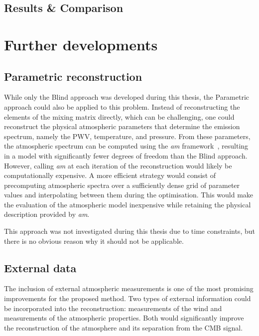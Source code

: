 \documentclass[../../thesis.tex]{subfiles}
\begin{document}
\subsection{Results \& Comparison} 


\section{Further developments}


\subsection{Parametric reconstruction}

While only the Blind approach was developed during this thesis, the Parametric approach could also be applied to this problem. Instead of reconstructing the elements of the mixing matrix directly, which can be challenging, one could reconstruct the physical atmospheric parameters that determine the emission spectrum, namely the PWV, temperature, and pressure.
From these parameters, the atmospheric spectrum can be computed using the \emph{am} framework~\cite{paine2024}, resulting in a model with significantly fewer degrees of freedom than the Blind approach. However, calling \emph{am} at each iteration of the reconstruction would likely be computationally expensive. A more efficient strategy would consist of precomputing atmospheric spectra over a sufficiently dense grid of parameter values and interpolating between them during the optimisation. This would make the evaluation of the atmospheric model inexpensive while retaining the physical description provided by \emph{am}.

This approach was not investigated during this thesis due to time constraints, but there is no obvious reason why it should not be applicable.

\subsection{External data}

The inclusion of external atmospheric measurements is one of the most promising improvements for the proposed method. Two types of external information could be incorporated into the reconstruction: measurements of the wind and measurements of the atmospheric properties. Both would significantly improve the reconstruction of the atmosphere and its separation from the CMB signal.
\end{document}
